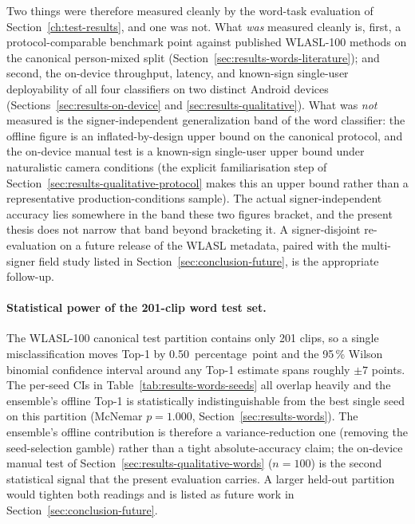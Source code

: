 Two things were therefore measured cleanly by the word-task
evaluation of Section~\ref{ch:test-results}, and one was not.
What \emph{was} measured cleanly is, first, a
protocol-comparable benchmark point against published WLASL-100
methods on the canonical person-mixed split
(Section~\ref{sec:results-words-literature}); and second, the
on-device throughput, latency, and known-sign single-user
deployability of all four classifiers on two distinct Android
devices (Sections~\ref{sec:results-on-device} and
\ref{sec:results-qualitative}). What was \emph{not} measured is
the signer-independent generalization band of the word
classifier: the offline figure is an inflated-by-design upper
bound on the canonical protocol, and the on-device manual test
is a known-sign single-user upper bound under naturalistic
camera conditions (the explicit familiarisation step of
Section~\ref{sec:results-qualitative-protocol} makes this an
upper bound rather than a representative production-conditions
sample). The actual signer-independent accuracy lies somewhere
in the band these two figures bracket, and the present thesis
does not narrow that band beyond bracketing it. A
signer-disjoint re-evaluation on a future release of the WLASL
metadata, paired with the multi-signer field study listed in
Section~\ref{sec:conclusion-future}, is the appropriate
follow-up.

\paragraph{Statistical power of the 201-clip word test set.}
The WLASL-100 canonical test partition contains only 201 clips, so a
single misclassification moves Top-1 by \SI{0.50}{percentage point}
and the 95\,\% Wilson binomial confidence interval around any Top-1
estimate spans roughly \(\pm 7\) points. The per-seed CIs in
Table~\ref{tab:results-words-seeds} all overlap heavily and the
ensemble's offline Top-1 is statistically indistinguishable from the
best single seed on this partition (McNemar $p = 1.000$,
Section~\ref{sec:results-words}). The ensemble's offline contribution
is therefore a variance-reduction one (removing the seed-selection
gamble) rather than a tight absolute-accuracy claim; the on-device
manual test of Section~\ref{sec:results-qualitative-words} (\(n=100\))
is the second statistical signal that the present evaluation carries.
A larger held-out partition would tighten both readings and is
listed as future work in Section~\ref{sec:conclusion-future}.

